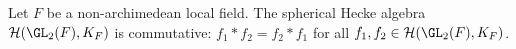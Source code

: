 Let $F$ be a non-archimedean local field. The spherical Hecke algebra $\mathcal H(\GL_2(F),K_F)$ is commutative:
$f_1*f_2=f_2*f_1$ for all $f_1,f_2\in\mathcal H(\GL_2(F),K_F)$.

